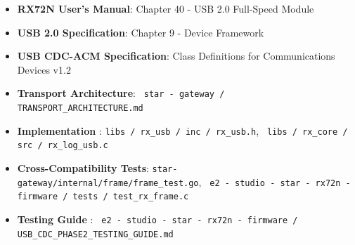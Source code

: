 \begin{itemize}
\item \textbf{RX72N User's Manual}: Chapter 40 - USB 2.0 Full-Speed Module
\item \textbf{USB 2.0 Specification}: Chapter 9 - Device Framework
\item \textbf{USB CDC-ACM Specification}: Class Definitions for Communications Devices v1.2
\item \textbf{Transport Architecture}: \texttt{
    star - gateway / TRANSPORT\_ARCHITECTURE.md
 }
  \item \textbf{Implementation} : \texttt{libs / rx\_usb / inc / rx\_usb.h}, \texttt {
    libs / rx\_core / src / rx\_log\_usb.c
 }
  \item \textbf{Cross-Compatibility Tests}: \texttt{star-gateway/internal/frame/frame\_test.go}, \texttt{
    e2 - studio - star - rx72n - firmware / tests / test\_rx\_frame.c
 }
  \item \textbf{Testing Guide} : \texttt {
    e2 - studio - star - rx72n - firmware / USB\_CDC\_PHASE2\_TESTING\_GUIDE.md
 }
  \end{itemize}
